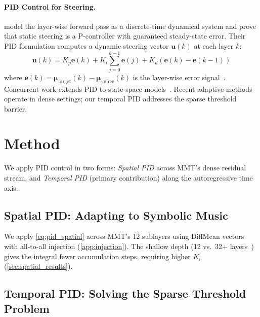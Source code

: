 \documentclass{article}
\theoremstyle{plain}
\begin{document}
\paragraph{PID Control for Steering.}
\citet{nguyen2026pid} model the layer-wise forward pass as a discrete-time dynamical system and prove that static steering is a P-controller with guaranteed steady-state error. Their PID formulation computes a dynamic steering vector $\mathbf{u}(k)$ at each layer $k$:
\begin{equation}
    \mathbf{u}(k) = K_p \mathbf{e}(k) + K_i \textstyle\sum_{j=0}^{k-1}\mathbf{e}(j) + K_d (\mathbf{e}(k) - \mathbf{e}(k{-}1))
    \label{eq:pid_spatial}
\end{equation}
where $\mathbf{e}(k) = \boldsymbol{\mu}_\text{target}(k) - \boldsymbol{\mu}_\text{source}(k)$ is the layer-wise error signal~\cite{astrom1995pid}. Concurrent work extends PID to state-space models~\cite{bharadwaj2025stupid}. Recent adaptive methods~\cite{vogels2025ids, kang2026directer, li2026svf, luo2025smitin} operate in dense settings; our temporal PID addresses the sparse threshold barrier.



\section{Method}
\label{sec:method}

We apply PID control in two forms: \emph{Spatial PID} across MMT's dense residual stream, and \emph{Temporal PID} (primary contribution) along the autoregressive time axis.

\subsection{Spatial PID: Adapting to Symbolic Music}
\label{sec:spatial_method}

We apply \cref{eq:pid_spatial} across MMT's 12 sublayers using DiffMean vectors with all-to-all injection (\cref{app:injection}). The shallow depth (12 vs.\ 32+ layers~\cite{nguyen2026pid}) gives the integral fewer accumulation steps, requiring higher $K_i$ (\cref{sec:spatial_results}).

\subsection{Temporal PID: Solving the Sparse Threshold Problem}
\label{sec:temporal_method}
\end{document}
